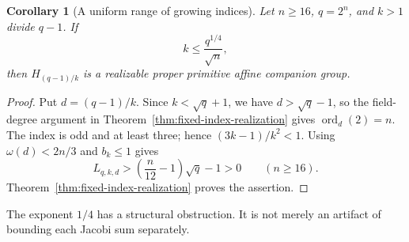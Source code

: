 \documentclass[11pt]{article}
\newtheorem{corollary}[theorem]{Corollary}
\begin{document}
\begin{corollary}[A uniform range of growing indices]
\label{cor:growing-index-realization}
Let $n\ge16$, $q=2^n$, and $k>1$ divide $q-1$. If
\begin{equation}\label{eq:growing-index-range}
 k\le\frac{q^{1/4}}{\sqrt n},
\end{equation}
then $H_{(q-1)/k}$ is a realizable proper primitive affine companion group.
\end{corollary}
\begin{proof}
Put $d=(q-1)/k$. Since $k<\sqrt q+1$, we have $d>\sqrt q-1$,
so the field-degree argument in Theorem~\ref{thm:fixed-index-realization}
gives $\operatorname{ord}_d(2)=n$. The index is odd and at least three;
hence $(3k-1)/k^2<1$. Using $\omega(d)<2n/3$ and $b_k\le1$ gives
\[
 L_{q,k,d}>\left(\frac n{12}-1\right)\sqrt q-1>0
 \qquad(n\ge16).
\]
Theorem~\ref{thm:fixed-index-realization} proves the assertion.
\end{proof}

The exponent $1/4$ has a structural obstruction. It is not merely
an artifact of bounding each Jacobi sum separately.
\end{document}
